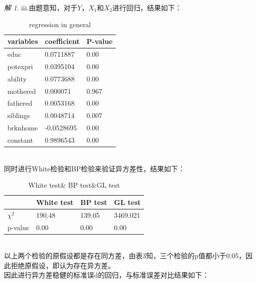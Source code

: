 \documentclass[a4paper]{ctexart}
\theoremstyle{remark}
\newtheorem*{solution}{解}
\begin{document}
\begin{itemize}
\begin{solution}
        iii.由题意知，对于$Y$，$X_1$和$X_2$进行回归，结果如下：
        \begin{table}[h]
            \centering
            \begin{tabular}{lll}%
                \hline
                variables & coefficient & P-value \\
                \hline
                educ &  0.0711887  & 0.00 \\
                potexpri & 0.0395104  & 0.00 \\
                ability & 0.0773688 & 0.00 \\
                mothered & 0.000071  & 0.967 \\
                fathered & 0.0053168  & 0.00 \\
                siblings & 0.0048714 & 0.007  \\
                brknhome & -0.0528695 & 0.00  \\
                constant & 0.9896543 & 0.00  \\
                \hline
            \end{tabular} 
            \caption{\label{font-table} regression in general} 
        \end{table}\\
        同时进行White检验和BP检验来验证异方差性，结果如下：
        \begin{table}[h]
            \centering
            \begin{tabular}{llll}%
                \hline
                 & White test & BP test & GL test\\
                \hline
                $\chi^2$ &  190.48  & 139.05 & 3469.021\\
                p-value & 0.00 & 0.00 & 0.00 \\
                \hline
            \end{tabular} 
            \caption{\label{font-table} White test\& BP test\&GL test} 
        \end{table}\\
        以上两个检验的原假设都是存在同方差，由表3知，三个检验的p值都小于0.05，因此拒绝原假设，即认为存在异方差。\\
        因此进行异方差稳健的标准误d的回归，与标准误差对比结果如下：\\
        \begin{table}[h]
            \centering
            \begin{tabular}{lll}%

\end{tabular}
\end{table}
\end{solution}
\end{itemize}
\end{document}
